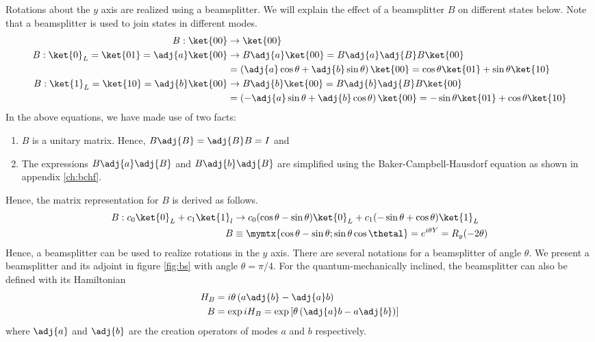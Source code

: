 Rotations about the $y$ axis are realized using a beamsplitter. We will explain the effect of a beamsplitter $B$ on different states below. Note that a beamsplitter is used to join states in different modes.
\begin{align}
B:\ket{00} &\rightarrow \ket{00}\\
B:\ket{0}_L = \ket{01} = \adj{a}\ket{00} &\rightarrow B\adj{a}\ket{00} = B\adj{a}\adj{B}B\ket{00}\\
&= \left(\adj{a}\cos\theta + \adj{b}\sin\theta\right)\ket{00} = \cos\theta\ket{01} + \sin\theta\ket{10}\\
B:\ket{1}_L = \ket{10} = \adj{b}\ket{00} &\rightarrow B\adj{b}\ket{00} = B\adj{b}\adj{B}B\ket{00}\\
&= \left(-\adj{a}\sin\theta + \adj{b}\cos\theta\right)\ket{00} = -\sin\theta\ket{01} + \cos\theta\ket{10}
\end{align}
In the above equations, we have made use of two facts: 
\begin{enumerate}
\item $B$ is a unitary matrix. Hence, $B\adj{B} = \adj{B}B = I$ and
\item The expressions $B\adj{a}\adj{B}$ and $B\adj{b}\adj{B}$ are simplified using the Baker-Campbell-Hausdorf equation as shown in appendix \ref{ch:bchf}.
\end{enumerate}
Hence, the matrix representation for $B$ is derived as follows.
\begin{align}
B: c_0\ket{0}_L + c_1\ket{1}_l &\rightarrow c_0(\cos\theta - \sin\theta)\ket{0}_L + c_1(-\sin\theta + \cos\theta)\ket{1}_L \\
B &\equiv \mymtx{\cos\theta -\sin\theta;\sin\theta \cos\thetal} = e^{i\theta Y} = R_y(-2\theta)
\end{align}
Hence, a beamsplitter can be used to realize rotations in the $y$ axis. There are several notations for a beamsplitter of angle $\theta$. We present a beamsplitter and its adjoint in figure \ref{fig:bs} with angle $\theta = \pi/4$.
For the quantum-mechanically inclined, the beamsplitter can also be defined with its Hamiltonian
\begin{align}
H_B &= i\theta\left(a\adj{b} - \adj{a}b\right)\\
B &= \exp{iH_B} = \text{exp}\left[\theta\left(\adj{a}b-a\adj{b}\right)\right]
\end{align}
where $\adj{a}$ and $\adj{b}$ are the creation operators of modes $a$ and $b$ respectively.

